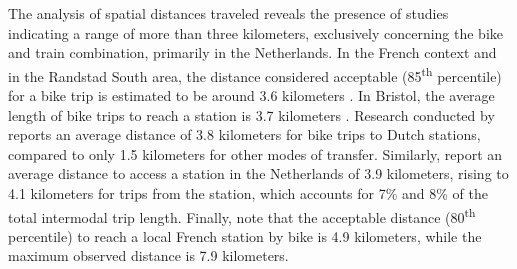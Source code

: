 \begin{refsegment}
The analysis of spatial distances traveled reveals the presence of studies indicating a range of more than three kilometers, exclusively concerning the bike and train combination, primarily in the Netherlands. In the French context and in the Randstad South area, the distance considered acceptable (85\textsuperscript{th} percentile) for a bike trip is estimated to be around 3.6 kilometers \textcolor{blue}{\autocites[62]{rabaud_quand_2022}[45]{la_paix_puello_modelling_2015}}. In Bristol, the average length of bike trips to reach a station is 3.7 kilometers \textcolor{blue}{\autocite[192]{sherwin_practices_2011}}. Research conducted by \textcolor{blue}{\textcite[14]{shelat_analysing_2018}} reports an average distance of 3.8 kilometers for bike trips to Dutch stations, compared to only 1.5 kilometers for other modes of transfer. Similarly, \textcolor{blue}{\textcite[225-226]{keijer_how_2000}} report an average distance to access a station in the Netherlands of 3.9 kilometers, rising to 4.1 kilometers for trips from the station, which accounts for 7\% and 8\% of the total intermodal trip length. Finally, \textcolor{blue}{\textcite[13]{hasiak_access_2019}} note that the acceptable distance (80\textsuperscript{th} percentile) to reach a local French station by bike is 4.9 kilometers, while the maximum observed distance is 7.9 kilometers.%


\end{refsegment}
